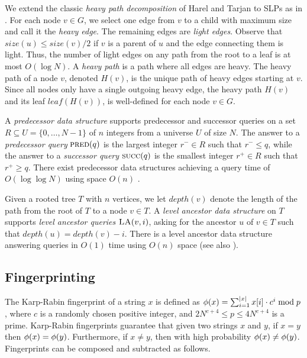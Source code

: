 \documentclass[11pt]{article}
\newcommand{\levelanc}{\ensuremath{\textsc{LA}}}
\renewcommand{\succ}{\ensuremath{\textsc{succ}}}
\newcommand{\pred}{\ensuremath{\textsc{pred}}}
\newcommand{\fp}{\ensuremath\phi}
\newcommand{\size}{\ensuremath{\mathit{size}}}
\newcommand{\depth}{\ensuremath{\mathit{depth}}}
\newcommand{\leaf}{\ensuremath{\mathit{leaf}}}
\newcommand{\heavypath}{\ensuremath{H}}
\newcommand{\slp}{\ensuremath{G} }
\begin{document}
We extend the classic \emph{heavy path decomposition} of Harel and Tarjan \cite{HT1984} to SLPs as in \cite{bille2011random}. For each node $v \in \slp$, we select one edge from $v$ to a child with maximum size and call it the \emph{heavy edge}. The remaining edges are \emph{light edges}. Observe that $\size(u) \leq \size(v)/2$ if $v$ is a parent of $u$ and the edge connecting them is light. Thus, the number of light edges on any path from the root to a leaf is at most $O(\log N)$. 
A \emph{heavy path} is a path where all edges are heavy. The heavy path of a node $v$, denoted $\heavypath(v)$, is the unique path of heavy edges starting at $v$. Since all nodes only have a single outgoing heavy edge, the heavy path $\heavypath(v)$ and its leaf $\leaf(\heavypath(v))$, is well-defined for each node $v \in \slp$.




A \emph{predecessor data structure} supports predecessor and successor queries on a set $R \subseteq U = \{ 0, \ldots, N-1 \}$ of $n$ integers from a universe $U$ of size $N$. The answer to a \emph{predecessor query} $\pred(q)$ is the largest integer $r^- \in R$ such that $r^- \leq q$, while the answer to a \emph{successor query} $\succ(q)$ is the smallest integer $r^+ \in R$ such that $r^+ \geq q$. There exist predecessor data structures achieving a query time of $O(\log \log N)$ using space $O(n)$ \cite{van1976design, mehlhorn1990bounded, willard1983log}.

Given a rooted tree $T$ with $n$ vertices, we let $\depth(v)$ denote the length of the path from the root of $T$ to a node $v \in T$. A \emph{level ancestor data structure} on $T$ supports \emph{level ancestor queries} $\levelanc(v, i)$, asking for the ancestor $u$ of $v \in T$ such that $\depth(u) = \depth(v)-i$. There is a level ancestor data structure answering queries in $O(1)$ time using $O(n)$ space \cite{dietz1991finding} (see also \cite{berkman1994finding, alstrup2000improved, bender2004level}).

\subsection{Fingerprinting}
The Karp-Rabin fingerprint \cite{karp1987efficient} of a string $x$ is defined as $\fp(x) = \sum_{i=1}^{|x|} x[i] \cdot c^i \bmod p$, where $c$ is a randomly chosen positive integer, and $2N^{c+4} \leq p \leq 4N^{c+4}$ is a prime. Karp-Rabin fingerprints guarantee that given two strings $x$ and $y$, if $x = y$ then $\fp(x) = \fp(y)$. Furthermore, if $x \neq y$, then with high probability $\fp(x) \neq \fp(y)$. Fingerprints can be composed and subtracted as follows.
\end{document}

